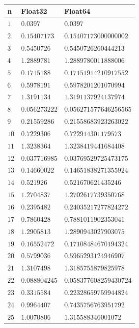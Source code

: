 \documentclass{article}
\begin{document}
\begin{center}
	\begin{tabular}{|p{}|p{5cm}|p{5cm}|} \hline
		\textbf{n} & \textbf{Float32} & \textbf{Float64}  \\
		\hline 
		$1$ & $0.0397$ & $0.0397$ \\ 
		\hline
		$2$ & $0.15407173$ & $0.15407173000000002$ \\ 
		\hline
		$3$ & $0.5450726$ & $0.5450726260444213$ \\ 
		\hline
		$4$ & $1.2889781$ & $1.2889780011888006$ \\ 
		\hline
		$5$ & $0.1715188$ & $0.17151914210917552$ \\ 
		\hline
		$6$ & $0.5978191$ & $0.5978201201070994$ \\ 
		\hline
		$7$ & $1.3191134$ & $1.3191137924137974$ \\ 
		\hline
		$8$ & $0.056273222$ & $0.056271577646256565$ \\ 
		\hline
		$9$ & $0.21559286$ & $0.21558683923263022$ \\ 
		\hline
		$10$ & $0.7229306$ & $0.722914301179573$ \\ 
		\hline
		$11$ & $1.3238364$ & $1.3238419441684408$ \\ 
		\hline
		$12$ & $0.037716985$ & $0.03769529725473175$ \\ 
		\hline
		$13$ & $0.14660022$ & $0.14651838271355924$ \\ 
		\hline
		$14$ & $0.521926$ & $0.521670621435246$ \\ 
		\hline
		$15$ & $1.2704837$ & $1.2702617739350768$ \\ 
		\hline
		$16$ & $0.2395482$ & $0.24035217277824272$ \\ 
		\hline
		$17$ & $0.7860428$ & $0.7881011902353041$ \\ 
		\hline
		$18$ & $1.2905813$ & $1.2890943027903075$ \\ 
		\hline
		$19$ & $0.16552472$ & $0.17108484670194324$ \\ 
		\hline
		$20$ & $0.5799036$ & $0.5965293124946907$ \\ 
		\hline
		$21$ & $1.3107498$ & $1.3185755879825978$ \\ 
		\hline
		$22$ & $0.088804245$ & $0.058377608259430724$ \\ 
		\hline
		$23$ & $0.3315584$ & $0.22328659759944824$ \\ 
		\hline
		$24$ & $0.9964407$ & $0.7435756763951792$ \\ 
		\hline
		$25$ & $1.0070806$ & $1.315588346001072$ \\ 

\end{tabular}
\end{center}
\end{document}

